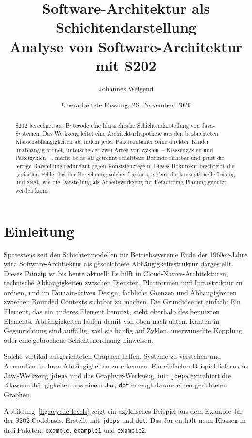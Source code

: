 \documentclass[a4paper,11pt]{article}
\title{Software-Architektur als Schichtendarstellung\\
  \large Analyse von Software-Architektur mit S202}
\author{Johannes Weigend}
\date{\"Uberarbeitete Fassung, 26.~November~2026}
\begin{document}
\maketitle

\begin{abstract}
S202 berechnet aus Bytecode eine hierarchische Schichtendarstellung von
Java-Systemen. Das Werkzeug leitet eine Architekturhypothese aus den
beobachteten Klassenabh\"angigkeiten ab, indem jeder Paketcontainer seine
direkten Kinder unabh\"angig ordnet, unterscheidet zwei Arten von
Zyklen~-- Klassenzyklen und Paketzyklen~--, macht beide als getrennt
schaltbare Befunde sichtbar und pr\"uft die fertige Darstellung redundant
gegen Konsistenzregeln. Dieses Dokument beschreibt die typischen Fehler
bei der Berechnung solcher Layouts, erkl\"art die konzeptionelle L\"osung
und zeigt, wie die Darstellung als Arbeitswerkzeug f\"ur
Refactoring-Planung genutzt werden kann.
\end{abstract}

\section{Einleitung}

Sp\"atestens seit den Schichtenmodellen f\"ur Betriebssysteme Ende der
1960er-Jahre wird Software-Architektur als
geschichtete Abh\"angigkeitsstruktur dargestellt. Dieses Prinzip ist bis
heute aktuell: Es hilft in Cloud-Native-Architekturen, technische
Abh\"angigkeiten zwischen Diensten, Plattformen und Infrastruktur zu ordnen,
und im Domain-driven Design, fachliche Grenzen und Abh\"angigkeiten zwischen
Bounded Contexts sichtbar zu machen. Die Grundidee ist einfach: Ein Element,
das ein anderes Element benutzt, steht oberhalb des benutzten Elements.
Abh\"angigkeiten laufen damit von oben nach unten. Kanten in Gegenrichtung
sind auff\"allig, weil sie h\"aufig auf Zyklen, unerw\"unschte Kopplung oder
eine gebrochene Schichtenordnung hinweisen.

Solche vertikal ausgerichteten Graphen helfen, Systeme zu verstehen und
Anomalien in ihren Abh\"angigkeiten zu erkennen. Ein einfaches Beispiel liefern
das Java-Werkzeug \texttt{jdeps} und das Graphviz-Werkzeug \texttt{dot}:
\texttt{jdeps} extrahiert die Klassenabh\"angigkeiten aus einem Jar,
\texttt{dot} erzeugt daraus einen gerichteten Graphen.

\newpage

Abbildung~\ref{fig:acyclic-levels} zeigt ein azyklisches Beispiel aus dem
Example-Jar der S202-Codebasis. Erstellt mit \texttt{jdeps} und \texttt{dot}.
Das Jar enth\"alt neun Klassen in drei Paketen:
\texttt{example}, \texttt{example1} und \texttt{example2}.
\end{document}
